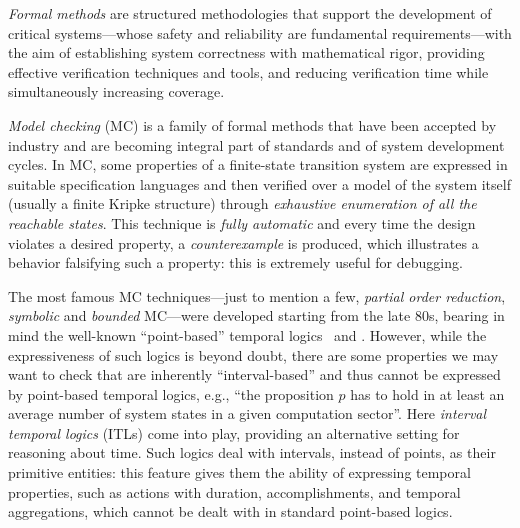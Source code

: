 \thispagestyle{empty}

\begin{center}
\bfseries \abstractname 
\end{center}

\emph{Formal methods} are structured methodologies that support the development of critical systems---whose safety and reliability are fundamental requirements---with the aim of 
establishing system correctness with mathematical rigor,
providing effective verification techniques and tools, and reducing verification time while simultaneously increasing coverage.

\emph{Model checking} (MC) is a family of formal methods that have been accepted by industry and are becoming integral part of standards and of system development cycles. 
In MC, some properties of a finite-state transition system are expressed in suitable specification languages and then verified over a model of the system itself (usually a finite Kripke structure) through \emph{exhaustive enumeration of all the reachable states}. This technique is \emph{fully automatic} and every time the design violates a desired property, a \emph{counterexample} is produced, which illustrates a behavior falsifying such a property: this is extremely useful for debugging.

The most famous MC techniques---just to mention a few, \emph{partial order reduction}, \emph{symbolic} and \emph{bounded} MC---were developed starting from the late 80s, bearing in mind the well-known ``point-based'' temporal logics \LTL\ and \CTL. However, while the expressiveness of such logics is beyond doubt,
there are some properties we may want to check that are inherently ``interval-based'' and thus cannot be expressed by point-based temporal logics, e.g., ``the proposition $p$ has to hold in at least an average number of system states in a given computation sector''. Here \emph{interval temporal logics} (ITLs) come into play, providing an alternative setting for 
reasoning about time. Such logics deal with intervals, instead of points, as their primitive entities: this feature gives them the ability of 
expressing temporal properties, such as actions with duration, accomplishments, and temporal aggregations, which cannot be dealt with in standard point-based logics.

